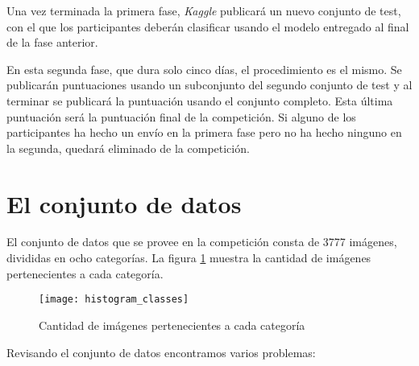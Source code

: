 Una vez terminada la primera fase, \textit{Kaggle} publicará un nuevo conjunto de test, con el que los participantes deberán clasificar usando el modelo entregado al final de la fase anterior.

En esta segunda fase, que dura solo cinco días, el procedimiento es el mismo. Se publicarán puntuaciones usando un subconjunto del segundo conjunto de test y al terminar se publicará la puntuación usando el conjunto completo. Esta última puntuación será la puntuación final de la competición. Si alguno de los participantes ha hecho un envío en la primera fase pero no ha hecho ninguno en la segunda, quedará eliminado de la competición.

\section{El conjunto de datos}
\label{dataset}

El conjunto de datos que se provee en la competición consta de 3777 imágenes,
divididas en ocho categorías. La figura \ref{histogram} muestra la cantidad de
imágenes pertenecientes a cada categoría.

\begin{figure}
  \centering
  \caption{Cantidad de imágenes pertenecientes a cada categoría}
\label{histogram}
  \texttt{[image: histogram\_classes]}
\end{figure}

Revisando el conjunto de datos encontramos varios problemas:


